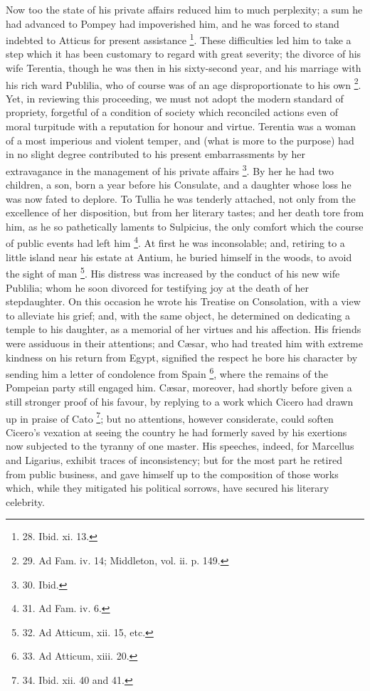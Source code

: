 Now too the state of his
private affairs reduced him to much perplexity; a sum he had advanced
to Pompey had impoverished him, and he was forced to stand
indebted to Atticus for present assistance \footnote{28. Ibid.
xi. 13.}. These difficulties led him to take a step which it has been
customary to regard with great severity; the divorce of his wife
Terentia, though he was then in his sixty-second year, and his
marriage with his rich ward Publilia, who of course was of an age
disproportionate to his own \footnote{29. Ad Fam. iv. 14; Middleton,
vol. ii. p. 149.}.
Yet, in reviewing this proceeding, we must not adopt the modern
standard of propriety, forgetful of a condition of society which
reconciled actions even of moral turpitude with a reputation for
honour and virtue. Terentia was a woman of a most imperious and
violent temper, and (what is more to the purpose) had in no slight
degree contributed to his present embarrassments by her extravagance
in the management of his private affairs \footnote{30. Ibid.}. By her he had two children, a son, born a year before his
Consulate, and a daughter whose loss he was now fated to deplore. To
Tullia he was tenderly attached, not only from the excellence of her
disposition, but from her literary tastes; and her death tore from
him, as he so pathetically laments to Sulpicius, the only comfort
which the course of public events had left him \footnote{31. Ad Fam. iv. 6.}. At first he was inconsolable; and, retiring to a little
island near his estate at Antium, he buried himself in the woods, to
avoid the sight of man \footnote{32. Ad Atticum, xii. 15, etc.}.
His distress was increased by the conduct of his new wife Publilia;
whom he soon divorced for testifying joy at the death of her
stepdaughter. On this occasion he wrote his Treatise on Consolation,
with a view to alleviate his grief; and, with the same object, he
determined on dedicating a temple to his daughter, as a memorial of
her virtues and his affection. His friends were assiduous in their
attentions; and Cæsar, who had treated him with extreme kindness
on his return from Egypt, signified the respect he bore his
character by sending him a letter of condolence from Spain \footnote{33. Ad Atticum, xiii. 20.}, where the remains of the Pompeian party still engaged him. Cæsar,
moreover, had shortly before given a still stronger proof of his
favour, by replying to a work which Cicero had drawn up in praise of
Cato \footnote{34. Ibid. xii. 40 and 41.}; but no
attentions, however considerate, could soften Cicero's vexation at
seeing the country he had formerly saved by his exertions now
subjected to the tyranny of one master. His speeches, indeed, for
Marcellus and Ligarius, exhibit traces of inconsistency; but for the
most part he retired from public business, and gave himself up to the
composition of those works which, while they mitigated his political
sorrows, have secured his literary celebrity.

